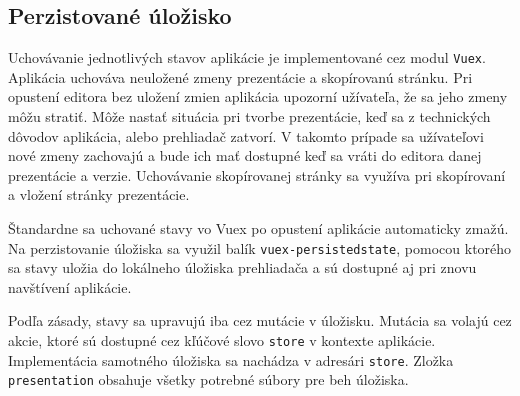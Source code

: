 \vspace{5mm}
\vspace{5mm}

\subsection{Perzistované úložisko}
Uchovávanie jednotlivých stavov aplikácie je implementované cez modul \texttt{Vuex}. Aplikácia uchováva neuložené zmeny prezentácie a skopírovanú stránku. Pri opustení editora bez uložení zmien aplikácia upozorní užívateľa, že sa jeho zmeny môžu stratiť. Môže nastať situácia pri tvorbe prezentácie, keď sa z technických dôvodov aplikácia, alebo prehliadač zatvorí. V takomto prípade sa užívateľovi nové zmeny zachovajú a bude ich mať dostupné keď sa vráti do editora danej prezentácie a verzie. Uchovávanie skopírovanej stránky sa využíva pri skopírovaní a vložení stránky prezentácie. 

Štandardne sa uchované stavy vo Vuex po opustení aplikácie automaticky zmažú. Na perzistovanie úložiska sa využil balík \texttt{vuex-persistedstate}, pomocou ktorého sa stavy uložia do lokálneho úložiska prehliadača a sú dostupné aj pri znovu navštívení aplikácie.

Podľa zásady, stavy sa upravujú iba cez mutácie v úložisku. Mutácia sa volajú cez akcie, ktoré sú dostupné cez kľúčové slovo \texttt{store} v kontexte aplikácie. Implementácia samotného úložiska sa nachádza v adresári \texttt{store}. Zložka \texttt{presentation} obsahuje všetky potrebné súbory pre beh úložiska.

